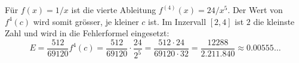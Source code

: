 Für $f(x) = 1/x$ ist die vierte Ableitung $f^{(4)}(x) = 24/x^{5}$. 
Der Wert von $f^{4}(c)$ wird somit grösser, je kleiner $c$ ist.
Im Inzervall $[2,4]$ ist $2$ die kleinste Zahl und wird in die Fehlerformel eingesetzt:
\begin{equation}
    E = \frac{512}{69120}f^{4}(c) = \frac{512}{69120} \cdot \frac{24}{2^{5}} = \frac{512 \cdot 24}{69120 \cdot 32} = \frac{12288}{2.211.840}\approx 0.00555\dots
\end{equation}



